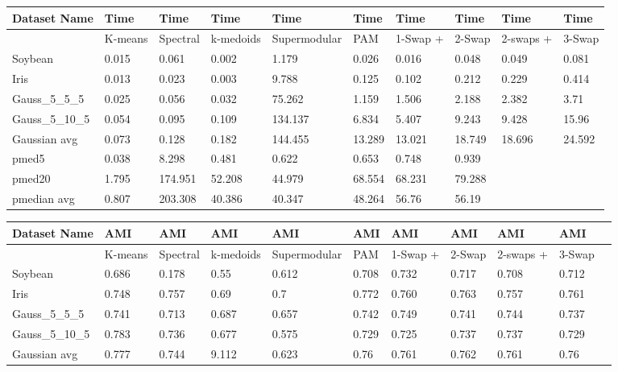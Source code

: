 \documentclass{article}
\begin{document}
\begin{figure*}[h]
\label{fig:flat_results}
\small
\begin{tabular}{ | l | l | l | l | l | l | l | l | l | l | }
\hline
	Dataset Name & Time & Time & Time & Time & Time & Time & Time & Time & Time \\ \hline
	&K-means & Spectral & k-medoids & Supermodular & PAM & 1-Swap + & 2-Swap & 2-swaps + & 3-Swap  \\ \hline
	Soybean & 0.015 & 0.061 & 0.002 & 1.179 & 0.026 & 0.016 & 0.048 & 0.049 & 0.081 \\ 
	Iris & 0.013 & 0.023 & 0.003 & 9.788 & 0.125 & 0.102 & 0.212 & 0.229 & 0.414 \\ 
	Gauss\_5\_5\_5 & 0.025 & 0.056 & 0.032 & 75.262 & 1.159 & 1.506 & 2.188 & 2.382 & 3.71 \\ 
	Gauss\_5\_10\_5 & 0.054 & 0.095 & 0.109 & 134.137 & 6.834 & 5.407 & 9.243 & 9.428 & 15.96 \\ 
	Gaussian avg & 0.073 & 0.128 & 0.182 & 144.455 & 13.289 & 13.021 & 18.749 & 18.696 & 24.592 \\ 
	pmed5 & 0.038 & 8.298 & 0.481 & 0.622 & 0.653 & 0.748 & 0.939 & \  & \  \\ 
	pmed20 & 1.795 & 174.951 & 52.208 & 44.979 & 68.554 & 68.231 & 79.288 & \  & \  \\ 
	pmedian avg & 0.807 & 203.308 & 40.386 & 40.347 & 48.264 & 56.76 & 56.19 & \  & \  \\ \hline
\end{tabular}
\vspace{0.2 cm}

\begin{tabular}{ | l | l | l | l | l | l | l | l | l | l | l | }
\hline
	Dataset Name & AMI & AMI & AMI & AMI & AMI & AMI & AMI & AMI & AMI  \\ \hline
	& K-means & Spectral & k-medoids & Supermodular & PAM & 1-Swap + & 2-Swap & 2-swaps + & 3-Swap   \\ \hline
	Soybean & 0.686 & 0.178 & 0.55 & 0.612 & 0.708 & 0.732 & 0.717 & 0.708 & 0.712 \\ 
	Iris & 0.748 & 0.757 & 0.69 & 0.7 & 0.772 & 0.760 & 0.763 & 0.757 & 0.761 \\ 
	Gauss\_5\_5\_5 & 0.741 & 0.713 & 0.687 & 0.657 & 0.742 & 0.749 & 0.741 & 0.744 & 0.737  \\ 
	Gauss\_5\_10\_5 & 0.783 & 0.736 & 0.677 & 0.575 & 0.729 & 0.725 & 0.737 & 0.737& 0.729  \\ 
	Gaussian avg & 0.777 & 0.744 & 9.112 & 0.623 & 0.76 & 0.761 & 0.762 & 0.761 & 0.76 \\ \hline
\end{tabular}
\vspace{0.2 cm}


\end{figure*}
\end{document}
